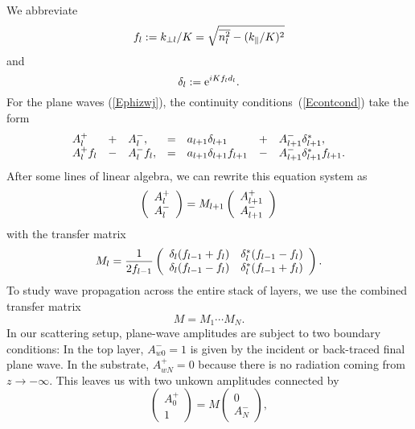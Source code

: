 We abbreviate
\begin{equation}
  f_l := k_{\perp l}/K = \sqrt{\overline{n_l^2}-(k_\parallel/K)^2}
\end{equation}
and
\begin{equation}
   \delta_l := \text{e}^{iKf_l d_l}.
\end{equation}
For the plane waves (\ref{Ephizwj}),
the continuity conditions~(\ref{Econtcond}) take the form
\begin{equation}\label{Econt2}
  \begin{array}{lclclcl}
  A^+_l &+& A^-_l,
  &=&
  a_{l+1}\delta_{l+1} &+& A^-_{l+1}\delta_{l+1}^*,
  \\
  A^+_l f_l  &-& A^-_l f_l,
  &=&
 a_{l+1}\delta_{l+1} f_{l+1} &-& A^-_{l+1}\delta_{l+1}^* f_{l+1}.
  \end{array}
\end{equation}
After some lines of linear algebra,
we can rewrite this equation system as
\begin{equation}\label{EcMc}
  \left( \begin{array}{c}A^+_l\\A^-_l\end{array} \right)
  = M_{l+1} \left( \begin{array}{c}A^+_{l+1}\\A^-_{l+1}\end{array} \right)
\end{equation}
with the transfer matrix
\begin{equation}
  M_l
   = \frac{1}{2f_{l-1}}
   \left(\begin{array}{cc}
       \delta_l(f_{l-1}+f_l)&\delta_l^*(f_{l-1}-f_l)\\
       \delta_l(f_{l-1}-f_l)&\delta_l^*(f_{l-1}+f_l)
   \end{array}\right).
\end{equation}
To study wave propagation across the entire stack of layers,
we use the combined transfer matrix
\begin{equation}
   M = M_1 \cdots M_N.
\end{equation}
In our scattering setup,
plane-wave amplitudes are subject to two boundary conditions:
In the top layer, $A^-_{w0}=1$ is given by the
incident or back-traced final plane wave.
In the substrate, $A^+_{wN}=0$ because there is no radiation
coming from $z\to-\infty$.
This leaves us with two unkown amplitudes connected by
\begin{equation}
  \left( \begin{array}{c}A^+_0\\1\end{array} \right)
  = M \left( \begin{array}{c}0\\A^-_N\end{array} \right),
\end{equation}
